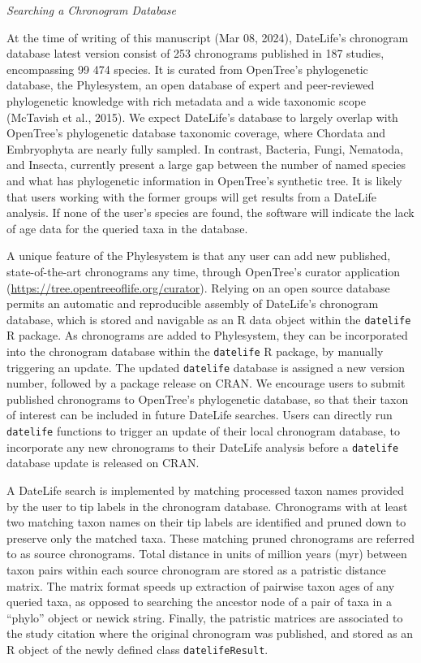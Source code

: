 \documentclass[english,man]{apa6}
\begin{document}
\begin{center}
\emph{Searching a Chronogram Database}
\end{center}

At the time of writing of this manuscript
(Mar 08, 2024),
DateLife's chronogram database latest version consist of 253 chronograms published in 187 studies, encompassing 99 474 species. It is curated from OpenTree's phylogenetic database, the Phylesystem, an open database of expert and peer-reviewed phylogenetic knowledge with rich metadata and a wide taxonomic scope (McTavish et al., 2015). We expect DateLife's database to largely overlap with OpenTree's phylogenetic database taxonomic coverage, where Chordata and Embryophyta are nearly fully sampled. In contrast, Bacteria, Fungi, Nematoda, and Insecta, currently present a large gap between the number of named species and what has phylogenetic information in OpenTree's synthetic tree. It is likely that users working with the former groups will get results from a DateLife analysis. If none of the user's species are found, the software will indicate the lack of age data for the queried taxa in the database.

A unique feature of the Phylesystem is that any user can add new published, state-of-the-art chronograms any time, through OpenTree's curator application (\url{https://tree.opentreeoflife.org/curator}). Relying on an open source database permits an automatic and reproducible assembly of DateLife's chronogram database, which is stored and navigable as an R data object within the \texttt{datelife} R package. As chronograms are added to Phylesystem, they can be incorporated into the chronogram database within the \texttt{datelife} R package, by manually triggering an update. The updated \texttt{datelife} database is assigned a new version number, followed by a package release on CRAN.
We encourage users to submit published chronograms to OpenTree's phylogenetic database, so that their taxon of interest can be included in future DateLife searches.
Users can directly run \texttt{datelife} functions to trigger an update of their local chronogram database, to incorporate any new chronograms to their DateLife analysis before a \texttt{datelife} database update is released on CRAN.

A DateLife search is implemented by matching processed taxon names provided by the user to tip labels in the chronogram database. Chronograms with at least two matching taxon names on their tip labels are identified and pruned down to preserve only the matched taxa.
These matching pruned chronograms are referred to as source chronograms.
Total distance in units of million years (myr) between taxon pairs within each source chronogram are stored as a patristic distance matrix.
The matrix format speeds up extraction of pairwise taxon ages of any queried taxa, as opposed to searching the ancestor node of a pair of taxa in a \enquote{phylo} object or newick string.
Finally, the patristic matrices are associated to the study citation where the original chronogram was published, and stored as an R object of the newly defined class \texttt{datelifeResult}.
\end{document}
